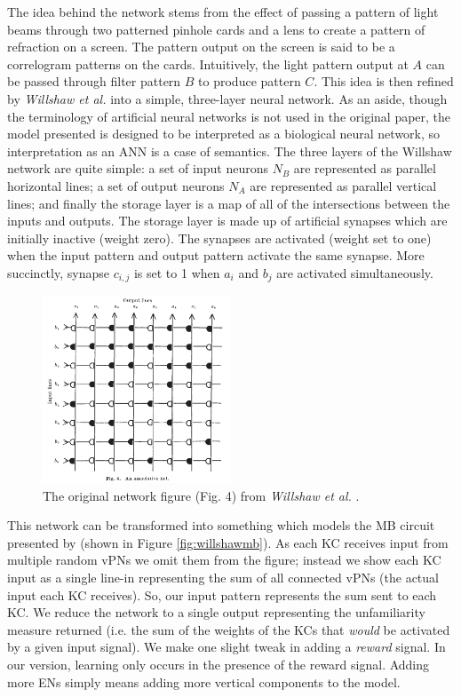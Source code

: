 \documentclass[a4paper,12pt,twoside,openright]{article}
\begin{document}
The idea behind the network stems from the effect of passing a pattern of light beams through two
patterned pinhole cards and a lens to create a pattern of refraction on a screen. The pattern output
on the screen is said to be a correlogram patterns on the cards. Intuitively, the light pattern output
at $A$ can be passed through filter pattern $B$ to produce pattern $C$. This idea is then refined by
\textit{Willshaw et al.} into a simple, three-layer neural network. As an aside, though the terminology of artificial
neural networks is not used in the original paper, the model presented is designed to be interpreted as
a biological neural network, so interpretation as an ANN is a case of semantics. The three layers of the
Willshaw network are quite simple: a set of input neurons $N_B$ are represented as parallel horizontal
lines; a set of output neurons $N_A$ are represented as parallel vertical lines; and finally the storage
layer is a map of all of the intersections between the inputs and outputs. The storage layer is made up of
artificial synapses which are initially inactive (weight zero). The synapses are activated (weight set to one)
when the input pattern and output pattern activate the same synapse. More succinctly, synapse $c_{i,j}$ is set
to 1 when $a_i$ and $b_j$ are activated simultaneously.

\begin{figure}[h]
 
  \centering
  \includegraphics[width=0.5\textwidth]{Willshaw1969Model}
  \caption{
    \label{fig:willshawnet} The original network figure (Fig. 4) from \textit{Willshaw et al.} \cite{Willshaw1969}.
  }
 
\end{figure}

This network can be transformed into something which models the MB circuit presented by \cite{Ardin2016}(shown in Figure \ref{fig:willshawmb}).
As each KC receives input from multiple random vPNs we omit them from the figure; instead we show each KC input as
a single line-in representing the sum of all connected vPNs (the actual input each KC receives). So, our
input pattern represents the sum sent to each KC. We reduce the network to a single output representing the
unfamiliarity measure returned (i.e. the sum of the weights of the KCs that \textit{would} be activated by a given input signal). We
make one slight tweak in adding a \textit{reward} signal. In our version, learning only occurs in the presence of
the reward signal. Adding more ENs simply means adding more vertical components to the model. 
\end{document}
